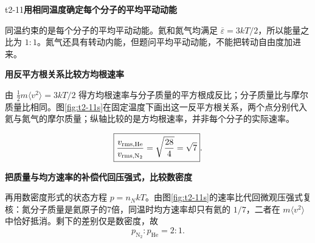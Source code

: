 \LectureAnswerSection

\begin{drillsolution}{t2-11}\textbf{用相同温度确定每个分子的平均平动动能}\par\nobreak
同温约束的是每个分子的平均平动动能。氦和氮气均满足 $\overline\varepsilon=3kT/2$，所以能量之比为 $\boxed{1:1}$。氮气还具有转动内能，但题问平均平动动能，不能把转动自由度加进来。


\par\medskip{}\noindent\textbf{用反平方根关系比较方均根速率}\par\nobreak
由 $\tfrac12m\langle v^2\rangle=3kT/2$ 得方均根速率与分子质量的平方根成反比；分子质量比与摩尔质量比相同。图\ref{fig:t2-11s}在固定温度下画出这一反平方根关系，两个点分别代入氦与氮气的摩尔质量；纵轴比较的是方均根速率，并非每个分子的实际速率。

\[\boxed{\frac{v_{{\mathrm{rms}},\rm He}}{v_{{\mathrm{rms}},\rm N_2}}
=\sqrt{\frac{28}{4}}=\sqrt7}.\]


\par\medskip{}\noindent\textbf{把质量与均方速率的补偿代回压强式，比较数密度}\par\nobreak
再用数密度形式的状态方程 $p=n_NkT$。由图\ref{fig:t2-11s}的速率比代回微观压强式复核：氮分子质量是氦原子的7倍，同温时均方速率却只有氦的 $1/7$，二者在 $m\langle v^2\rangle$ 中恰好抵消。剩下的差别仅是数密度，故
\[\boxed{p_{\mathrm{N_2}}:p_{\mathrm{He}}=2:1}.\]

\end{drillsolution}
